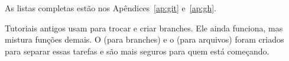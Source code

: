 As listas completas estão nos Apêndices~\ref{ap:git}
e~\ref{ap:gh}.

\begin{dica}
Tutoriais antigos usam  para trocar e criar branches.
Ele ainda funciona, mas mistura funções demais. O  (para
branches) e o  (para arquivos) foram criados para
separar essas tarefas e são mais seguros para quem está começando.
\end{dica}
